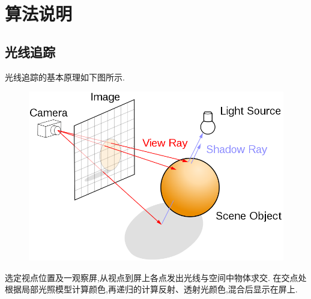 \section{算法说明}
\subsection{光线追踪}
光线追踪的基本原理如下图所示.
\begin{figure}[H]
  \centering
  \includegraphics[scale=0.4]{res/ray_tracing.png}
\end{figure}

选定视点位置及一观察屏,从视点到屏上各点发出光线与空间中物体求交.
在交点处根据局部光照模型计算颜色,再递归的计算反射、透射光颜色,混合后显示在屏上.

